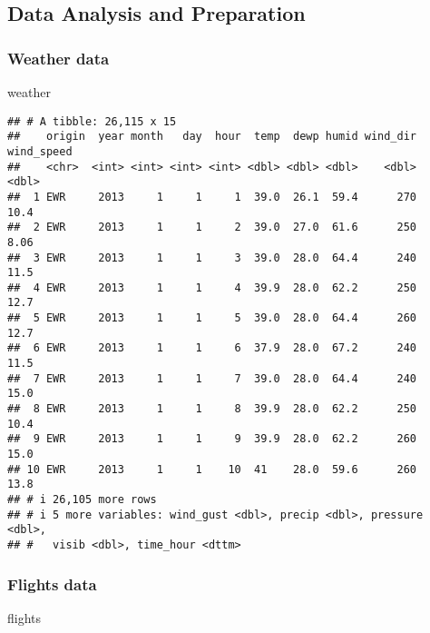 \documentclass[
]{article}
\newenvironment{Shaded}{\begin{snugshade}}{\end{snugshade}}
\newcommand{\NormalTok}[1]{#1}
\begin{document}
\subsection{Data Analysis and
Preparation}\label{data-analysis-and-preparation}

\subsubsection{Weather data}\label{weather-data}

\begin{Shaded}
\begin{Highlighting}[]
\NormalTok{weather}
\end{Highlighting}
\end{Shaded}

\begin{verbatim}
## # A tibble: 26,115 x 15
##    origin  year month   day  hour  temp  dewp humid wind_dir wind_speed
##    <chr>  <int> <int> <int> <int> <dbl> <dbl> <dbl>    <dbl>      <dbl>
##  1 EWR     2013     1     1     1  39.0  26.1  59.4      270      10.4 
##  2 EWR     2013     1     1     2  39.0  27.0  61.6      250       8.06
##  3 EWR     2013     1     1     3  39.0  28.0  64.4      240      11.5 
##  4 EWR     2013     1     1     4  39.9  28.0  62.2      250      12.7 
##  5 EWR     2013     1     1     5  39.0  28.0  64.4      260      12.7 
##  6 EWR     2013     1     1     6  37.9  28.0  67.2      240      11.5 
##  7 EWR     2013     1     1     7  39.0  28.0  64.4      240      15.0 
##  8 EWR     2013     1     1     8  39.9  28.0  62.2      250      10.4 
##  9 EWR     2013     1     1     9  39.9  28.0  62.2      260      15.0 
## 10 EWR     2013     1     1    10  41    28.0  59.6      260      13.8 
## # i 26,105 more rows
## # i 5 more variables: wind_gust <dbl>, precip <dbl>, pressure <dbl>,
## #   visib <dbl>, time_hour <dttm>
\end{verbatim}

\subsubsection{Flights data}\label{flights-data}

\begin{Shaded}
\begin{Highlighting}[]
\NormalTok{flights}
\end{Highlighting}
\end{Shaded}
\end{document}
